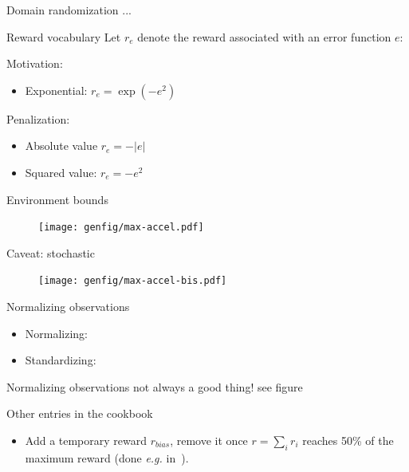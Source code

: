 \documentclass[9pt, aspectratio=169]{beamer}
\begin{document}
\begin{frame}{Domain randomization}
    ...
\end{frame}

\begin{frame}{Reward vocabulary}
    Let $r_e$ denote the reward associated with an error function $e$:

    Motivation:
    \begin{itemize}
        \item Exponential: $r_e = \exp(-e^2)$
    \end{itemize}

    Penalization:
    \begin{itemize}
        \item Absolute value $r_e = -|e|$
        \item Squared value: $r_e = -e^2$
    \end{itemize}
\end{frame}

\begin{frame}{Environment bounds}
    \begin{figure}
        \texttt{[image: genfig/max-accel.pdf]}
    \end{figure}
\end{frame}

\begin{frame}{Caveat: stochastic}
    \begin{figure}
        \texttt{[image: genfig/max-accel-bis.pdf]}
    \end{figure}
\end{frame}

\begin{frame}{Normalizing observations}
    \begin{itemize}
        \item Normalizing:
        \item Standardizing:
    \end{itemize}
\end{frame}

\begin{frame}{Normalizing observations}
    not always a good thing! see figure
\end{frame}

\begin{frame}{Other entries in the cookbook}
    \begin{itemize}
        \item Add a temporary reward $r_{bias}$, remove it once $r = \sum_i r_i$ reaches 50\% of the maximum reward (done \emph{e.g.} in~\cite{rudin2022advanced}).
    \end{itemize}
\end{frame}
\end{document}
